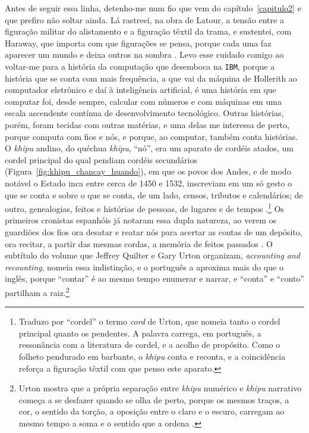 Antes de seguir essa linha, detenho-me num fio que vem do capítulo~\ref{capitulo2} e que prefiro não soltar ainda. Lá rastreei, na obra de Latour, a tensão entre a figuração militar do alistamento e a figuração têxtil da trama, e sustentei, com Haraway, que importa com que figurações se pensa, porque cada uma faz aparecer um mundo e deixa outros na sombra \parencite{Haraway2023Ficar}. Levo esse cuidado comigo ao voltar-me para a história da computação que desemboca na \texttt{IBM}, porque a história que se conta com mais frequência, a que vai da máquina de Hollerith ao computador eletrônico e daí à inteligência artificial, é uma história em que computar foi, desde sempre, calcular com números e com máquinas em uma escala ascendente contínua de desenvolvimento tecnológico. Outras histórias, porém, foram tecidas com outras matérias, e uma delas me interessa de perto, porque computa com fios e nós, e porque, ao computar, também conta histórias. O \textit{khipu} andino, do quéchua \textit{khipu}, \enquote{nó}, era um aparato de cordéis atados, um cordel principal do qual pendiam cordéis secundários (Figura~\ref{fig:khipu_chancay_huando}), em que os povos dos Andes, e de modo notável o Estado inca entre cerca de 1450 e 1532, inscreviam em um só gesto o que se conta e sobre o que se conta, de um lado, censos, tributos e calendários; de outro, genealogias, feitos e histórias de pessoas, de lugares e de tempos \parencite{urton2003signs, quilter2002narrative}.\footnote{Traduzo por \enquote{cordel} o termo \textit{cord} de Urton, que nomeia tanto o cordel principal quanto os pendentes. A palavra carrega, em português, a ressonância com a literatura de cordel, e a acolho de propósito. Como o folheto pendurado em barbante, o \textit{khipu} conta e reconta, e a coincidência reforça a figuração têxtil com que penso este aparato.} Os primeiros cronistas espanhóis já notaram essa dupla natureza, ao verem os guardiões dos fios ora desatar e reatar nós para acertar as contas de um depósito, ora recitar, a partir das mesmas cordas, a memória de feitos passados \parencite[p.~67]{quilter2002narrative}. O subtítulo do volume que Jeffrey Quilter e Gary Urton organizam, \emph{accounting and recounting}, nomeia essa indistinção, e o português a aproxima mais do que o inglês, porque \enquote{contar} é ao mesmo tempo enumerar e narrar, e \enquote{conta} e \enquote{conto} partilham a raiz.\footnote{Urton mostra que a própria separação entre \textit{khipu} numérico e \textit{khipu} narrativo começa a se desfazer quando se olha de perto, porque os mesmos traços, a cor, o sentido da torção, a oposição entre o claro e o escuro, carregam ao mesmo tempo a soma e o sentido que a ordena \parencite{quilter2002narrative}.}

